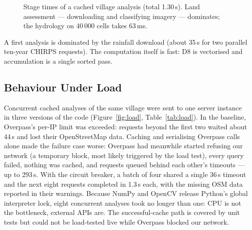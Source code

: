 \documentclass[manuscript,screen,review]{acmart}
\begin{document}
\begin{figure}[h]
  \centering
  \caption{Stage times of a cached village analysis (total 1.30\,s). Land assessment ---
  downloading and classifying imagery --- dominates; the hydrology on 40\,000 cells takes
  63\,ms.}
  \label{fig:stages}
\end{figure}

A first analysis is dominated by the rainfall download (about 35\,s for two parallel ten-year
CHIRPS requests). The computation itself is fast: D8 is vectorised and accumulation is a single
sorted pass.

\subsection{Behaviour Under Load}
\label{sec:loadtest}
Concurrent cached analyses of the same village were sent to one server instance in three
versions of the code (Figure~\ref{fig:load}, Table~\ref{tab:load}). In the baseline, Overpass's
per-IP limit was exceeded: requests beyond the first two waited about 44\,s and lost their
OpenStreetMap data. Caching and serialising Overpass calls alone made the failure case worse:
Overpass had meanwhile started refusing our network (a temporary block, most likely triggered
by the load test), every query failed, nothing was cached, and requests queued behind each
other's timeouts --- up to 293\,s. With the circuit breaker, a batch of four shared a single
36\,s timeout and the next eight requests completed in 1.3\,s each, with the missing OSM data
reported in their warnings. Because NumPy and OpenCV release Python's global interpreter lock,
eight concurrent analyses took no longer than one: CPU is not the bottleneck, external APIs
are. The successful-cache path is covered by unit tests but could not be load-tested live while
Overpass blocked our network.
\end{document}
